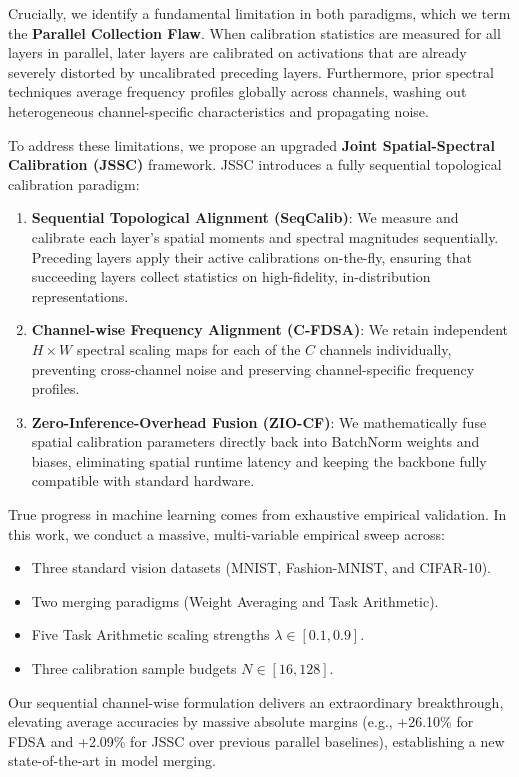 \documentclass{article}
\begin{document}
Crucially, we identify a fundamental limitation in both paradigms, which we term the \textbf{Parallel Collection Flaw}. When calibration statistics are measured for all layers in parallel, later layers are calibrated on activations that are already severely distorted by uncalibrated preceding layers. Furthermore, prior spectral techniques average frequency profiles globally across channels, washing out heterogeneous channel-specific characteristics and propagating noise.

To address these limitations, we propose an upgraded \textbf{Joint Spatial-Spectral Calibration (JSSC)} framework. JSSC introduces a fully sequential topological calibration paradigm:
\begin{enumerate}
    \item \textbf{Sequential Topological Alignment (SeqCalib)}: We measure and calibrate each layer's spatial moments and spectral magnitudes sequentially. Preceding layers apply their active calibrations on-the-fly, ensuring that succeeding layers collect statistics on high-fidelity, in-distribution representations.
    \item \textbf{Channel-wise Frequency Alignment (C-FDSA)}: We retain independent $H \times W$ spectral scaling maps for each of the $C$ channels individually, preventing cross-channel noise and preserving channel-specific frequency profiles.
    \item \textbf{Zero-Inference-Overhead Fusion (ZIO-CF)}: We mathematically fuse spatial calibration parameters directly back into BatchNorm weights and biases, eliminating spatial runtime latency and keeping the backbone fully compatible with standard hardware.
\end{enumerate}

True progress in machine learning comes from exhaustive empirical validation. In this work, we conduct a massive, multi-variable empirical sweep across:
\begin{itemize}
    \item Three standard vision datasets (MNIST, Fashion-MNIST, and CIFAR-10).
    \item Two merging paradigms (Weight Averaging and Task Arithmetic).
    \item Five Task Arithmetic scaling strengths $\lambda \in [0.1, 0.9]$.
    \item Three calibration sample budgets $N \in [16, 128]$.
\end{itemize}
Our sequential channel-wise formulation delivers an extraordinary breakthrough, elevating average accuracies by massive absolute margins (e.g., +26.10\% for FDSA and +2.09\% for JSSC over previous parallel baselines), establishing a new state-of-the-art in model merging.
\end{document}
